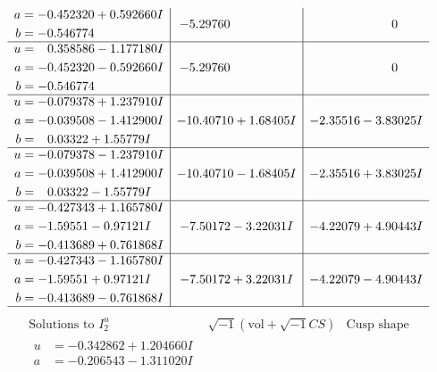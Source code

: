 \documentclass[1p]{elsarticle_modified}
\theoremstyle{definition}
\newcommand{\I}{\sqrt{-1}}
\begin{document}
$$\begin{array}{c|c|c}
\begin{aligned}
a &= -0.452320 + 0.592660 I \\
b &= -0.546774\phantom{ +0.000000I}\end{aligned}
 & -5.29760\phantom{ +0.000000I} & \phantom{-0.000000 } 0 \\ \hline\begin{aligned}
u &= \phantom{-}0.358586 - 1.177180 I \\
a &= -0.452320 - 0.592660 I \\
b &= -0.546774\phantom{ +0.000000I}\end{aligned}
 & -5.29760\phantom{ +0.000000I} & \phantom{-0.000000 } 0 \\ \hline\begin{aligned}
u &= -0.079378 + 1.237910 I \\
a &= -0.039508 - 1.412900 I \\
b &= \phantom{-}0.03322 + 1.55779 I\end{aligned}
 & -10.40710 + 1.68405 I & -2.35516 - 3.83025 I \\ \hline\begin{aligned}
u &= -0.079378 - 1.237910 I \\
a &= -0.039508 + 1.412900 I \\
b &= \phantom{-}0.03322 - 1.55779 I\end{aligned}
 & -10.40710 - 1.68405 I & -2.35516 + 3.83025 I \\ \hline\begin{aligned}
u &= -0.427343 + 1.165780 I \\
a &= -1.59551 - 0.97121 I \\
b &= -0.413689 + 0.761868 I\end{aligned}
 & -7.50172 - 3.22031 I & -4.22079 + 4.90443 I \\ \hline\begin{aligned}
u &= -0.427343 - 1.165780 I \\
a &= -1.59551 + 0.97121 I \\
b &= -0.413689 - 0.761868 I\end{aligned}
 & -7.50172 + 3.22031 I & -4.22079 - 4.90443 I\\
 \hline 
 \end{array}$$\newpage$$\begin{array}{c|c|c}  
\text{Solutions to }I^u_{2}& \I (\text{vol} + \sqrt{-1}CS) & \text{Cusp shape}\\
 \hline 
\begin{aligned}
u &= -0.342862 + 1.204660 I \\
a &= -0.206543 - 1.311020 I \\

\end{aligned}
\end{array}$$
\end{document}
